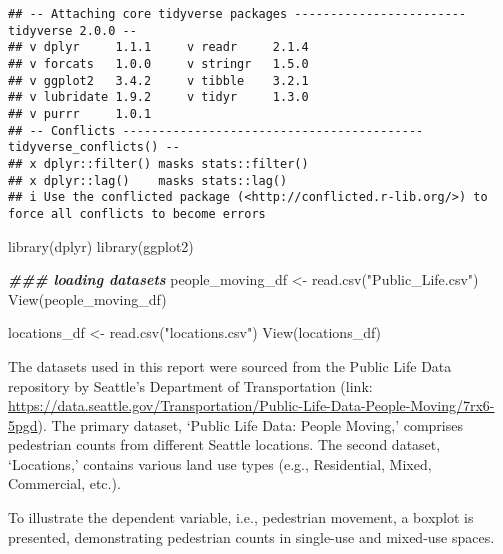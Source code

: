 \documentclass[
]{article}
\newenvironment{Shaded}{\begin{snugshade}}{\end{snugshade}}
\newcommand{\DocumentationTok}[1]{\textcolor[rgb]{0.56,0.35,0.01}{\textbf{\textit{#1}}}}
\newcommand{\FunctionTok}[1]{\textcolor[rgb]{0.00,0.00,0.00}{#1}}
\newcommand{\NormalTok}[1]{#1}
\newcommand{\OtherTok}[1]{\textcolor[rgb]{0.56,0.35,0.01}{#1}}
\newcommand{\SpecialCharTok}[1]{\textcolor[rgb]{0.00,0.00,0.00}{#1}}
\newcommand{\StringTok}[1]{\textcolor[rgb]{0.31,0.60,0.02}{#1}}
\begin{document}
\begin{verbatim}
## -- Attaching core tidyverse packages ------------------------ tidyverse 2.0.0 --
## v dplyr     1.1.1     v readr     2.1.4
## v forcats   1.0.0     v stringr   1.5.0
## v ggplot2   3.4.2     v tibble    3.2.1
## v lubridate 1.9.2     v tidyr     1.3.0
## v purrr     1.0.1     
## -- Conflicts ------------------------------------------ tidyverse_conflicts() --
## x dplyr::filter() masks stats::filter()
## x dplyr::lag()    masks stats::lag()
## i Use the conflicted package (<http://conflicted.r-lib.org/>) to force all conflicts to become errors
\end{verbatim}

\begin{Shaded}
\begin{Highlighting}[]
\FunctionTok{library}\NormalTok{(dplyr)}
\FunctionTok{library}\NormalTok{(ggplot2)}

\DocumentationTok{\#\#\# loading datasets}
\NormalTok{people\_moving\_df }\OtherTok{\textless{}{-}} \FunctionTok{read.csv}\NormalTok{(}\StringTok{"Public\_Life.csv"}\NormalTok{)}
\FunctionTok{View}\NormalTok{(people\_moving\_df)}

\NormalTok{locations\_df }\OtherTok{\textless{}{-}} \FunctionTok{read.csv}\NormalTok{(}\StringTok{"locations.csv"}\NormalTok{)}
\FunctionTok{View}\NormalTok{(locations\_df)}
\end{Highlighting}
\end{Shaded}

The datasets used in this report were sourced from the Public Life Data
repository by Seattle's Department of Transportation (link:
\url{https://data.seattle.gov/Transportation/Public-Life-Data-People-Moving/7rx6-5pgd}).
The primary dataset, `Public Life Data: People Moving,' comprises
pedestrian counts from different Seattle locations. The second dataset,
`Locations,' contains various land use types (e.g., Residential, Mixed,
Commercial, etc.).

To illustrate the dependent variable, i.e., pedestrian movement, a
boxplot is presented, demonstrating pedestrian counts in single-use and
mixed-use spaces.

\begin{Shaded}
\end{Shaded}
\end{document}
